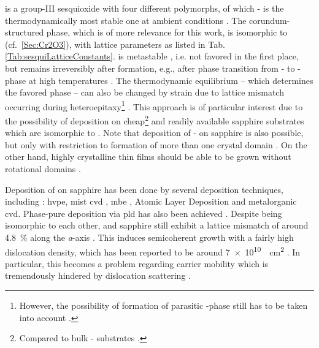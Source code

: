  is a group-III sesquioxide with four different polymorphs, of which \textbeta- is the thermodynamically most stable one at ambient conditions
    \cite{schewski2015,hassa2021a,petersen2023}.
The corundum-structured \agao{} phase, which is of more relevance for this work, is isomorphic to  (cf.~\ref{Sec:Cr2O3}), with lattice parameters as listed in Tab.\,\ref{Tab:sesquiLatticeConstants}.
\agao{} is metastable
    \cite{kaneko2023},
i.e. not favored in the first place, but remains irreversibly after formation, e.g., after phase transition from \textbeta- to \textalpha-phase at high temperatures
    \cite{pearton2018}.
The thermodynamic equilibrium -- which determines the favored phase -- can also be changed by strain due to lattice mismatch occurring during heteroepitaxy\footnote{
    However, the possibility of formation of parasitic \textbeta-phase still has to be taken into account
        \cite{petersen2023}.
    }
    \cite{schewski2015}.
This approach is of particular interest due to the possibility of deposition on cheap\footnote{
    Compared to bulk \textbeta- substrates
        \cite{yang2022,kaneko2023}.
}
and readily available sapphire substrates which are isomorphic to \agao{}
    \cite{pearton2018,polyakov2022,kaneko2023}.
Note that deposition of \textbeta- on sapphire is also possible, but only with restriction to formation of more than one crystal domain
    \cite{yang2022}.
On the other hand, highly crystalline
    \cite{pearton2018}
\agao{} thin films should be able to be grown without rotational domains
    \cite{yang2022}.

Deposition of \agao{} on sapphire has been done by several deposition techniques, including \cite{yang2022}:
    \gls{hvpe},
    mist \gls{cvd}
        \cite{kaneko2012},
    \gls{mbe}
        \cite{schewski2015},
    Atomic Layer Deposition and
    metalorganic \gls{cvd}.
Phase-pure deposition via \gls{pld} has also been achieved
    \cite{schewski2015,petersen2023}.
Despite being isomorphic to each other, \agao{} and sapphire still exhibit a lattice mismatch of around \qty{4.8}{\percent} along the \textit{a}-axis
    \cite{kaneko2023}.
This induces semicoherent growth with a fairly high dislocation density, which has been reported to be around \qty{7e10}{\per\square\cm}
    \cite{kaneko2012}.
In particular, this becomes a problem regarding carrier mobility which is tremendously hindered by dislocation scattering
    \cite{kaneko2023}.

